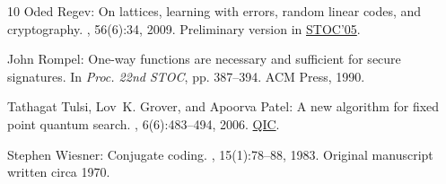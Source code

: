 \begin{thebibliography}{10}
{\sc Oded Regev}: On lattices, learning with errors, random linear codes, and
  cryptography.
, 56(6):34, 2009.
\newblock Preliminary version in
  \href{http://dx.doi.org/10.1145/1060590.1060603}{STOC'05}.
\newblock [\epfmtdoi{10.1145/1568318.1568324}]

{\sc John Rompel}: One-way functions are necessary and sufficient for secure
  signatures.
\newblock In {\em Proc. 22nd STOC}, pp. 387--394. ACM Press, 1990.
\newblock [\epfmtdoi{10.1145/100216.100269}]

{\sc Tathagat Tulsi, Lov~K. Grover, and Apoorva Patel}: A new algorithm for
  fixed point quantum search.
, 6(6):483--494, 2006.
\newblock \href{http://www.rintonpress.com/journals/qiconline.html\#v6n6}{QIC}.

{\sc Stephen Wiesner}: Conjugate coding.
, 15(1):78--88, 1983.
\newblock Original manuscript written circa 1970.
\newblock [\epfmtdoi{10.1145/1008908.1008920}]

\end{thebibliography}

